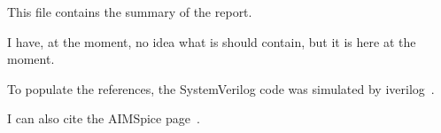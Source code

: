 This file contains the summary of the report.

I have, at the moment, no idea what is should contain, but it is here at the moment.

To populate the references, the SystemVerilog code was simulated by iverilog~\cite{icarusVL}.

I can also cite the AIMSpice page~\cite{AIMSpice}.